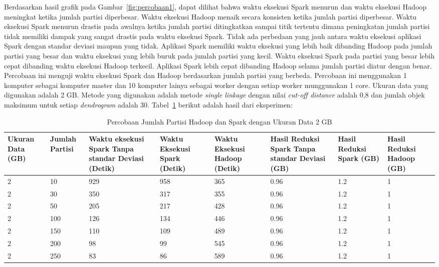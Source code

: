 Berdasarkan hasil grafik pada Gambar~\ref{fig:percobaan1}, dapat dilihat bahwa waktu eksekusi Spark menurun dan waktu eksekusi Hadoop meningkat ketika jumlah partisi diperbesar. Waktu eksekusi Hadoop menaik secara konsisten ketika jumlah partisi diperbesar. Waktu eksekusi Spark menurun drastis pada awalnya ketika jumlah partisi ditingkatkan sampai titik tertentu dimana peningkatan jumlah partisi tidak memiliki dampak yang sangat drastis pada waktu eksekusi Spark. Tidak ada perbedaan yang jauh antara waktu eksekusi aplikasi Spark dengan standar deviasi maupun yang tidak. Aplikasi Spark memiliki waktu eksekusi yang lebih baik dibanding Hadoop pada jumlah partisi yang besar dan waktu eksekusi yang lebih buruk pada jumlah partisi yang kecil. Waktu eksekusi Spark pada partisi yang besar lebih cepat dibanding waktu eksekusi Hadoop terkecil. Aplikasi Spark lebih cepat dibanding Hadoop selama jumlah partisi diatur dengan benar.\\



Percobaan ini menguji waktu eksekusi Spark dan Hadoop berdasarkan jumlah partisi yang berbeda. Percobaan ini menggunakan 1 komputer sebagai komputer master dan 10 komputer lainya sebagai worker dengan setiap worker munggunakan 1 core. Ukuran data yang digunakan adalah 2 GB. Metode yang digunakan adalah metode \textit{single linkage} dengan nilai \textit{cut-off distance} adalah 0,8 dan jumlah objek maksimum untuk setiap \textit{dendrogram} adalah 30. Tabel~\ref{tab:spark2} berikut adalah hasil dari eksperimen:

\begin{table}[H] 
	\centering 
	\caption{Percobaan Jumlah Partisi Hadoop dan Spark dengan Ukuran Data 2 GB}
	\label{tab:spark2}
	\begin{tabular}{|p{1.1cm}|p{1.1cm}|p{2.5cm}|p{2.5cm}|p{2.5cm}|p{2cm}|p{1.5cm}|p{1.5cm}|}
\hline
Ukuran Data (GB) & Jumlah Partisi &  Waktu eksekusi Spark Tanpa standar Deviasi (Detik) & Waktu Eksekusi Spark (Detik) & Waktu Eksekusi Hadoop (Detik) & Hasil Reduksi Spark Tanpa standar Deviasi (GB) & Hasil Reduksi Spark (GB)  & Hasil Reduksi Hadoop (GB)\\ 
\hline
2 & 10 & 929  & 958  & 365  & 0.96 & 1.2 & 1 \\
\hline
2 & 30 & 350  & 317  & 355  & 0.96 & 1.2 & 1 \\
\hline
2 & 50 & 205  & 217  & 428  & 0.96 & 1.2 & 1 \\
\hline
2 & 100 & 126  & 134  & 446  & 0.96 & 1.2 & 1 \\
\hline
2 & 150 & 110  & 109  & 489  & 0.96 & 1.2 & 1 \\
\hline
2 & 200 & 98  & 99  & 545  & 0.96 & 1.2 & 1 \\
\hline
2 & 250 & 83  & 86  & 589  & 0.96 & 1.2 & 1 \\
\hline

\hline

	\end{tabular} 
\end{table}



